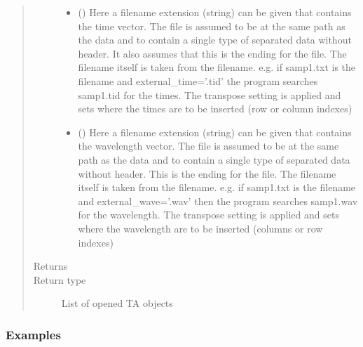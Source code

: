 \documentclass[letterpaper,10pt,english]{sphinxmanual}
\begin{document}
\begin{fulllineitems}
\begin{quote}
\begin{description}
\begin{itemize}
\item {} 
 (\sphinxstyleliteralemphasis{\sphinxupquote{ (}}\sphinxstyleliteralemphasis{\sphinxupquote{)}}) \textendash{} Here a filename extension (string) can be given that contains the time vector.
The file is assumed to be at the same path as the data and to contain a single
type of separated data without header. It also assumes that this is the ending
for the file. The filename itself is taken from the filename.
e.g. if samp1.txt is the filename and external\_time=’.tid’ the program searches
samp1.tid for the times. The transpose setting is applied and sets where the times are
to be inserted (row or column indexes)

\item {} 
 (\sphinxstyleliteralemphasis{\sphinxupquote{ (}}\sphinxstyleliteralemphasis{\sphinxupquote{)}}) \textendash{} Here a filename extension (string) can be given that contains the wavelength vector.
The file is assumed to be at the same path as the data and to contain a single type
of separated data without header. This is the ending for the file. The filename itself
is taken from the filename. e.g. if samp1.txt is the filename and external\_wave=’.wav’
then the program searches samp1.wav for the wavelength. The transpose setting is applied
and sets where the wavelength are to be inserted (columns or row indexes)

\end{itemize}

\item[{Returns}] \leavevmode


\item[{Return type}] \leavevmode
List of opened TA objects

\end{description}\end{quote}
\subsubsection*{Examples}


\end{fulllineitems}
\end{document}
